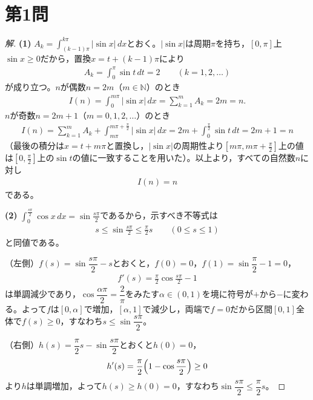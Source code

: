 \documentclass[../main.tex]{subfiles}
\begin{document}
\section*{第1問}

\begin{proof}[解]
  \textbf{(1)} $A_k=\displaystyle\int_{(k-1)\pi}^{k\pi}|\sin x|\,dx$とおく。$|\sin x|$は周期$\pi$を持ち，$[0,\pi]$上$\sin x\ge0$だから，置換$x=t+(k-1)\pi$により
  \begin{align*}
    A_k=\int_0^\pi\sin t\,dt=2\qquad(k=1,2,\dots)
  \end{align*}
  が成り立つ。$n$が偶数$n=2m$（$m\in\mathbb N$）のとき
  \begin{align*}
    I(n)=\int_0^{m\pi}|\sin x|\,dx=\sum_{k=1}^mA_k=2m=n.
  \end{align*}
  $n$が奇数$n=2m+1$（$m=0,1,2,\dots$）のとき
  \begin{align*}
    I(n)=\sum_{k=1}^mA_k+\int_{m\pi}^{m\pi+\frac\pi2}|\sin x|\,dx=2m+\int_0^{\frac\pi2}\sin t\,dt=2m+1=n
  \end{align*}
  （最後の積分は$x=t+m\pi$と置換し，$|\sin x|$の周期性より$[m\pi,m\pi+\frac\pi2]$上の値は$[0,\frac\pi2]$上の$\sin t$の値に一致することを用いた）。以上より，すべての自然数$n$に対し
  \begin{align*}
    I(n)=n
  \end{align*}
  である。

  \textbf{(2)} $\displaystyle\int_0^{\frac{s\pi}2}\cos x\,dx=\sin\frac{s\pi}2$であるから，示すべき不等式は
  \begin{align*}
    s\le\sin\frac{s\pi}2\le\frac\pi2s\qquad(0\le s\le1)\tag{$\ast$}
  \end{align*}
  と同値である。

  （左側）$f(s)=\sin\dfrac{s\pi}2-s$とおくと，$f(0)=0$，$f(1)=\sin\dfrac\pi2-1=0$，
  \begin{align*}
    f'(s)=\frac\pi2\cos\frac{s\pi}2-1
  \end{align*}
  は単調減少であり，$\cos\dfrac{\alpha\pi}2=\dfrac2\pi$をみたす$\alpha\in(0,1)$を境に符号が$+$から$-$に変わる。よって$f$は$[0,\alpha]$で増加，$[\alpha,1]$で減少し，両端で$f=0$だから区間$[0,1]$全体で$f(s)\ge0$，すなわち$s\le\sin\dfrac{s\pi}2$。

  （右側）$h(s)=\dfrac\pi2s-\sin\dfrac{s\pi}2$とおくと$h(0)=0$，
  \begin{align*}
    h'(s)=\frac\pi2\Bigl(1-\cos\frac{s\pi}2\Bigr)\ge0
  \end{align*}
  より$h$は単調増加，よって$h(s)\ge h(0)=0$，すなわち$\sin\dfrac{s\pi}2\le\dfrac\pi2s$。


\end{proof}
\end{document}
